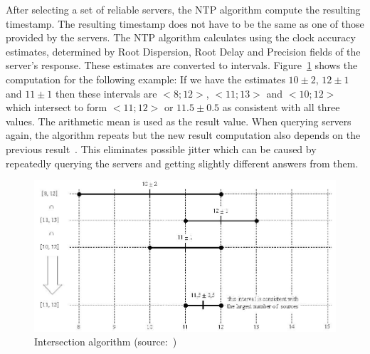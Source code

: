 After selecting a set of reliable servers, the NTP algorithm compute the resulting timestamp.
The resulting timestamp does not have to be the same
as one of those provided by the servers.
The NTP algorithm calculates using the clock accuracy estimates,
determined by Root Dispersion, Root Delay and Precision fields of the server's response.
These estimates are converted to intervals.
Figure~\ref{fig:ntp-intersection} shows the computation for the following example:
If we have the estimates $10 \pm 2$, $12 \pm 1$ and $11 \pm 1$
then these intervals are $<8; 12>$, $<11; 13>$ and $<10; 12>$ which
intersect to form $<11; 12>$ or $11.5 \pm 0.5$ as consistent with all three values.
The arithmetic mean is used as the result value.
When querying servers again, the algorithm repeats but the new result computation
also depends on the previous result~\cite{rfc5905,ntp-history}.
This eliminates possible jitter which can be caused by repeatedly querying the servers
and getting slightly different answers from them.

\begin{figure}
	\centering
	\includegraphics[width=13cm,keepaspectratio]{fig/Marzullo_example-1.jpg}
	\caption{Intersection algorithm (source:~\cite{wikipedia-marzullo})}
	\label{fig:ntp-intersection}
	\bigskip
\end{figure}
